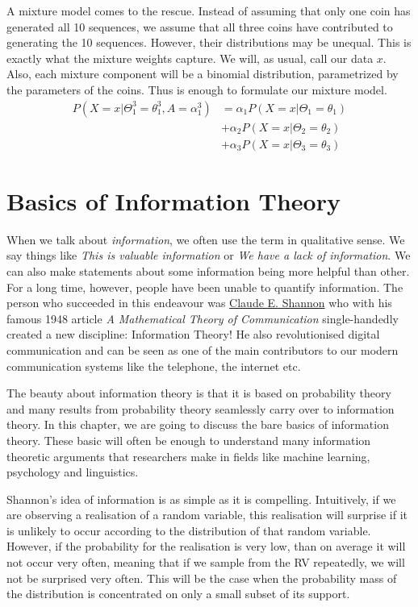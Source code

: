 A mixture model comes to the rescue. Instead of assuming that only one coin has generated all 10 sequences,
we assume that all three coins have contributed to generating the 10 sequences. However, their distributions
may be unequal. This is exactly what the mixture weights capture. We will, as usual, call our data
$ x $. Also, each mixture component will be a binomial distribution, parametrized by the parameters of
the coins. Thus is enough to formulate our mixture model.
\begin{align}
P(X=x|\Theta_{1}^{3}=\theta_{1}^{3}, A = \alpha_{1}^{3}) 
&= \alpha_{1}P(X=x|\Theta_{1}=\theta_{1}) \\
&+ \alpha_{2}P(X=x|\Theta_{2}=\theta_{2}) \nonumber \\
&+ \alpha_{3}P(X=x|\Theta_{3}=\theta_{3}) \nonumber
\end{align}




\section{Basics of Information Theory}

When we talk about \textit{information}, we often use the term in qualitative sense. We say things like \textit{This is valuable information} or 
\textit{We have a lack of information}. We can also make statements about some information being more helpful than other. For a long time, however,
people have been unable to quantify information. The person who succeeded in this endeavour was \href{https://en.wikipedia.org/wiki/Claude_Shannon}{Claude E. Shannon}
who with his famous 1948 article \textit{A Mathematical Theory of Communication} single-handedly created a new discipline: Information Theory! He also revolutionised
digital communication and can be seen as one of the main contributors to our modern communication systems like the telephone, the internet etc. 

The beauty about information theory is that it is based on probability theory and many results from probability theory seamlessly carry over to information theory.
In this chapter, we are going to discuss the bare basics of information theory. These basic will often be enough to understand many information theoretic arguments
that researchers make in fields like machine learning, psychology and linguistics.

Shannon's idea of information is as simple as it is compelling. Intuitively, if we are observing a realisation of a random variable, this realisation will surprise
if it is unlikely to occur according to the distribution of that random variable. However, if the probability for the realisation is very low, than on average it
will not occur very often, meaning that if we sample from the RV repeatedly, we will not be surprised very often. This will be the case when the probability
mass of the distribution is concentrated on only a small subset of its support. 

